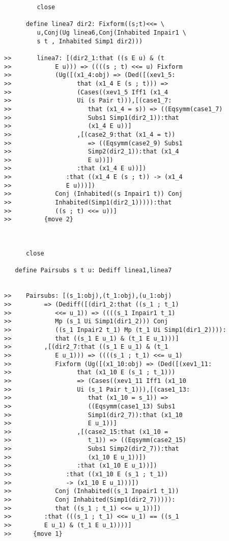 \documentclass[12pt]{article}
\begin{document}
\begin{verbatim}
         close

      define linea7 dir2: Fixform((s;t)<<= \
         u,Conj(Ug linea6,Conj(Inhabited Inpair1 \
         s t , Inhabited Simp1 dir2)))

>>       linea7: [(dir2_1:that ((s E u) & (t
>>            E u))) => ((((s ; t) <<= u) Fixform
>>            (Ug([(x1_4:obj) => (Ded([(xev1_5:
>>                  that (x1_4 E (s ; t))) =>
>>                  (Cases((xev1_5 Iff1 (x1_4
>>                  Ui (s Pair t))),[(case1_7:
>>                     that (x1_4 = s)) => ((Eqsymm(case1_7)
>>                     Subs1 Simp1(dir2_1)):that
>>                     (x1_4 E u))]
>>                  ,[(case2_9:that (x1_4 = t))
>>                     => ((Eqsymm(case2_9) Subs1
>>                     Simp2(dir2_1)):that (x1_4
>>                     E u))])
>>                  :that (x1_4 E u))])
>>               :that ((x1_4 E (s ; t)) -> (x1_4
>>               E u)))])
>>            Conj (Inhabited((s Inpair1 t)) Conj
>>            Inhabited(Simp1(dir2_1))))):that
>>            ((s ; t) <<= u))]
>>         {move 2}



      close

   define Pairsubs s t u: Dediff linea1,linea7


>>    Pairsubs: [(s_1:obj),(t_1:obj),(u_1:obj)
>>         => (Dediff([(dir1_2:that ((s_1 ; t_1)
>>            <<= u_1)) => ((((s_1 Inpair1 t_1)
>>            Mp (s_1 Ui Simp1(dir1_2))) Conj
>>            ((s_1 Inpair2 t_1) Mp (t_1 Ui Simp1(dir1_2)))):
>>            that ((s_1 E u_1) & (t_1 E u_1)))]
>>         ,[(dir2_7:that ((s_1 E u_1) & (t_1
>>            E u_1))) => ((((s_1 ; t_1) <<= u_1)
>>            Fixform (Ug([(x1_10:obj) => (Ded([(xev1_11:
>>                  that (x1_10 E (s_1 ; t_1)))
>>                  => (Cases((xev1_11 Iff1 (x1_10
>>                  Ui (s_1 Pair t_1))),[(case1_13:
>>                     that (x1_10 = s_1)) =>
>>                     ((Eqsymm(case1_13) Subs1
>>                     Simp1(dir2_7)):that (x1_10
>>                     E u_1))]
>>                  ,[(case2_15:that (x1_10 =
>>                     t_1)) => ((Eqsymm(case2_15)
>>                     Subs1 Simp2(dir2_7)):that
>>                     (x1_10 E u_1))])
>>                  :that (x1_10 E u_1))])
>>               :that ((x1_10 E (s_1 ; t_1))
>>               -> (x1_10 E u_1)))])
>>            Conj (Inhabited((s_1 Inpair1 t_1))
>>            Conj Inhabited(Simp1(dir2_7))))):
>>            that ((s_1 ; t_1) <<= u_1))])
>>         :that (((s_1 ; t_1) <<= u_1) == ((s_1
>>         E u_1) & (t_1 E u_1))))]
>>      {move 1}




\end{verbatim}
\end{document}
